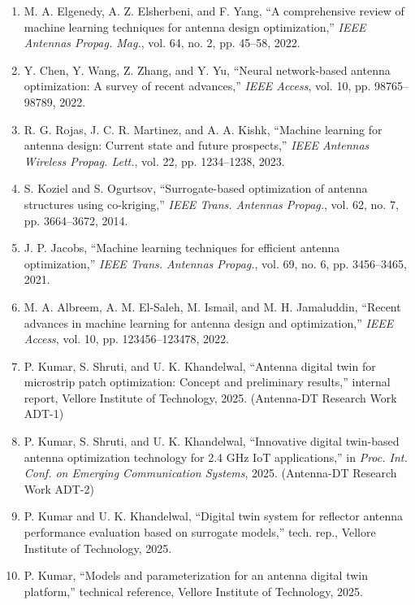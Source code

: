 \documentclass[conference]{IEEEtran}
\begin{document}
\begin{enumerate}
    \item M. A. Elgenedy, A. Z. Elsherbeni, and F. Yang, ``A comprehensive review of machine learning techniques for antenna design optimization,'' \emph{IEEE Antennas Propag. Mag.}, vol. 64, no. 2, pp. 45--58, 2022.
    \item Y. Chen, Y. Wang, Z. Zhang, and Y. Yu, ``Neural network-based antenna optimization: A survey of recent advances,'' \emph{IEEE Access}, vol. 10, pp. 98765--98789, 2022.
    \item R. G. Rojas, J. C. R. Martinez, and A. A. Kishk, ``Machine learning for antenna design: Current state and future prospects,'' \emph{IEEE Antennas Wireless Propag. Lett.}, vol. 22, pp. 1234--1238, 2023.
    \item S. Koziel and S. Ogurtsov, ``Surrogate-based optimization of antenna structures using co-kriging,'' \emph{IEEE Trans. Antennas Propag.}, vol. 62, no. 7, pp. 3664--3672, 2014.
    \item J. P. Jacobs, ``Machine learning techniques for efficient antenna optimization,'' \emph{IEEE Trans. Antennas Propag.}, vol. 69, no. 6, pp. 3456--3465, 2021.
    \item M. A. Albreem, A. M. El-Saleh, M. Ismail, and M. H. Jamaluddin, ``Recent advances in machine learning for antenna design and optimization,'' \emph{IEEE Access}, vol. 10, pp. 123456--123478, 2022.
    \item P. Kumar, S. Shruti, and U. K. Khandelwal, ``Antenna digital twin for microstrip patch optimization: Concept and preliminary results,'' internal report, Vellore Institute of Technology, 2025. (Antenna-DT Research Work ADT-1)
    \item P. Kumar, S. Shruti, and U. K. Khandelwal, ``Innovative digital twin-based antenna optimization technology for 2.4 GHz IoT applications,'' in \emph{Proc. Int. Conf. on Emerging Communication Systems}, 2025. (Antenna-DT Research Work ADT-2)
    \item P. Kumar and U. K. Khandelwal, ``Digital twin system for reflector antenna performance evaluation based on surrogate models,'' tech. rep., Vellore Institute of Technology, 2025.
    \item P. Kumar, ``Models and parameterization for an antenna digital twin platform,'' technical reference, Vellore Institute of Technology, 2025.
\end{enumerate}
\end{document}
